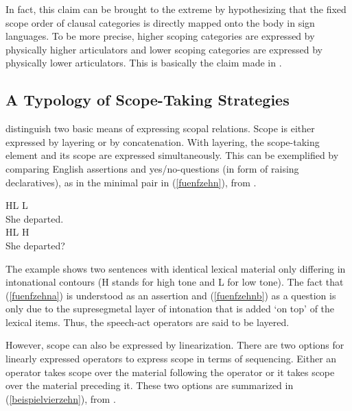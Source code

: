 In fact, this claim can be brought to the extreme by hypothesizing that the fixed scope order of clausal categories is directly mapped onto the body in sign languages. To be more precise, higher scoping categories are expressed by physically higher articulators and lower scoping categories are expressed by physically lower articulators. This is basically the claim made in \citet{bross2017scope}.

\subsection{A Typology of Scope-Taking Strategies}
\citet{bross2017scope} distinguish two basic means of expressing scopal relations. Scope is either expressed by layering or by concatenation. With layering, the scope-taking element and its scope are expressed simultaneously. This can be exemplified by comparing English assertions and yes/no-questions (in form of raising declaratives), as in the minimal pair in (\ref{fuenfzehn}), from \citet{bross2017scope}.

\begin{exe} 
\ex \label{fuenfzehn}
\begin{xlist} 
\ex 
\gll {} {\hspace{12pt} HL L} \\
She departed. \\ \label{fuenfzehna}
\ex 
\gll {} {\hspace{12pt} HL H} \\
She departed? \\ \label{fuenfzehnb} 
\end{xlist} 
\end{exe}

\noindent The example shows two sentences with identical lexical material only differing in intonational contours (H stands for high tone and L for low tone). The fact that (\ref{fuenfzehna}) is understood as an assertion and (\ref{fuenfzehnb}) as a question is only due to the supresegmetal layer of intonation that is added `on top' of the lexical items. Thus, the speech-act operators are said to be layered. 

However, scope can also be expressed by linearization. There are two options for linearly expressed operators to express scope in terms of sequencing. Either an operator takes scope over the material following the operator or it takes scope over the material preceding it. These two options are summarized in (\ref{beispielvierzehn}), from \citet{bross2017scope}.

